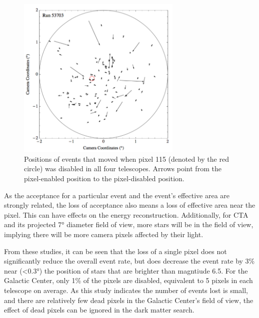    \begin{figure}[!ht]
      \centering
      \includegraphics[width=0.7\textwidth]{images/disabled_pixel/moving_events}
      \caption[Event Movement After Disabling Camera Pixels]{
        Positions of events that moved when pixel 115 (denoted by the red circle) was disabled in all four telescopes.  
        Arrows point from the pixel-enabled position to the pixel-disabled position.
      }
      \label{fig:dpix_move}
    \end{figure}

    As the acceptance for a particular event and the event's effective area are strongly related, the loss of acceptance also means a loss of effective area near the pixel.
    This can have effects on the energy reconstruction.
    Additionally, for CTA and its projected \ang{7} diameter field of view, more stars will be in the field of view, implying there will be more camera pixels affected by their light.
    
    From these studies, it can be seen that the loss of a single pixel does not significantly reduce the overall event rate, but does decrease the event rate by \nicetilde{}3\% near (<\ang{0.3}) the position of stars that are brighter than magntiude 6.5.
    For the Galactic Center, only 1\% of the pixels are disabled, equivalent to 5 pixels in each telescope on average.
    As this study indicates the number of events lost is small, and there are relatively few dead pixels in the Galactic Center's field of view, the effect of dead pixels can be ignored in the dark matter search.

